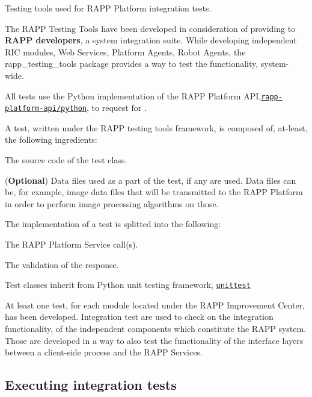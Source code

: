 Testing tools used for R\-A\-P\-P Platform integration tests.

The R\-A\-P\-P Testing Tools have been developed in consideration of providing to {\bfseries R\-A\-P\-P developers}, a system integration suite. While developing independent R\-I\-C modules, Web Services, Platform Agents, Robot Agents, the rapp\-\_\-testing\-\_\-tools package provides a way to test the functionality, system-\/wide.

All tests use the Python implementation of the R\-A\-P\-P Platform A\-P\-I,\href{https://github.com/rapp-project/rapp-api/tree/master/python}{\tt rapp-\/platform-\/api/python}, to request for .

A test, written under the R\-A\-P\-P testing tools framework, is composed of, at-\/least, the following ingredients\-:


\begin{DoxyItemize}
\item The source code of the test class.
\item ({\bfseries Optional}) Data files used as a part of the test, if any are used. Data files can be, for example, image data files that will be transmitted to the R\-A\-P\-P Platform in order to perform image processing algorithms on those.
\end{DoxyItemize}

The implementation of a test is splitted into the following\-:


\begin{DoxyItemize}
\item The R\-A\-P\-P Platform Service call(s).
\item The validation of the response.
\end{DoxyItemize}

Test classes inherit from Python unit testing framework, \href{https://docs.python.org/2.7/library/unittest.html}{\tt unittest}

At least one test, for each module located under the R\-A\-P\-P Improvement Center, has been developed. Integration test are used to check on the integration functionality, of the independent components which constitute the R\-A\-P\-P system. Those are developed in a way to also test the functionality of the interface layers between a client-\/side process and the R\-A\-P\-P Services.

\subsection*{Executing integration tests}


